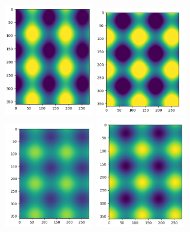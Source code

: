 \documentclass[10pt,letterpaper]{article}
\begin{document}
\begin{figure}
	\begin{center}
		\includegraphics[width=0.35\textwidth]{images/sin_data_0.PNG}
		\includegraphics[width=0.35\textwidth]{images/sin_data_1.PNG}
		\includegraphics[width=0.35\textwidth]{images/sin_data_2.PNG}
		\includegraphics[width=0.35\textwidth]{images/sin_data_3.PNG}

\end{center}
\end{figure}
\end{document}
